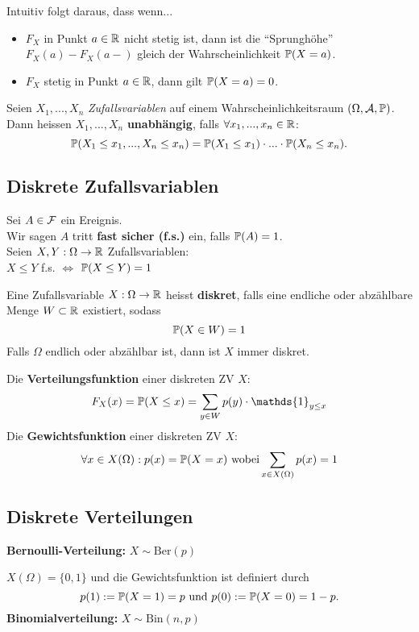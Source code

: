 Intuitiv folgt daraus, dass wenn...
\begin{itemize}
    \item $F_X$ in Punkt $a \in \R$ nicht stetig ist, dann ist die ``Sprunghöhe'' $F_X(a)-F_X(a-)$ gleich der Wahrscheinlichkeit $\P(X = a)$.
    \item $F_X$ stetig in Punkt $a \in \R$, dann gilt $\P(X = a) = 0$. 
\end{itemize}

\begin{mainbox}{}
    Seien $X_1, ...,X_n$ \textit{Zufallsvariablen} auf einem Wahrscheinlichkeitsraum $(\Omega, \A, \P)$. Dann heissen $X_1, ...,X_n$ \textbf{unabhängig}, falls $\forall x_1, ..., x_n \in \R$:
    $$
        \P(X_1 \leq x_1, ..., X_n \leq x_n) = \P(X_1 \leq x_1)\cdot ... \cdot \P(X_n \leq x_n).
	$$
\end{mainbox}


\subsection{Diskrete Zufallsvariablen}
Sei $A \in \F$ ein Ereignis.\\
Wir sagen $A$ tritt \textbf{fast sicher (f.s.)} ein, falls $\P(A)= 1$.
\\
Seien $X, Y: \Omega \to \R$ Zufallsvariablen: \\$X \leq Y$ f.s. $\iff$ $\P(X \leq Y)=1$


\begin{mainbox}{}
    Eine Zufallsvariable $X: \Omega \to \R$ heisst \textbf{diskret}, falls eine endliche oder abzählbare Menge $W \subset \R$ existiert, sodass
    $$\P(X \in W) = 1$$
    Falls $\Omega$ endlich oder abzählbar ist, dann ist $X$ immer diskret.
\end{mainbox}
Die \textbf{Verteilungsfunktion} einer diskreten ZV $X$: $$F_X(x)= \P(X \leq x)= \sum_{y\in W}p(y)\cdot \mathds{1}_{y\leq x}$$
Die \textbf{Gewichtsfunktion} einer diskreten ZV $X$: $$\forall x \in X(\Omega): p(x)= \P(X=x) \text{ wobei} \sum_{x \in X(\Omega)}p(x)= 1$$

\subsection{Diskrete Verteilungen}
\textbf{Bernoulli-Verteilung:} $X \sim \text{Ber}(p)$

$X(\Omega)= \{0, 1\}$ und die Gewichtsfunktion ist definiert durch
$$p(1):= \P(X = 1) = p \text{ und } p(0):=\P(X = 0) = 1 - p.$$
\textbf{Binomialverteilung:} $X \sim \text{Bin}(n, p)$

